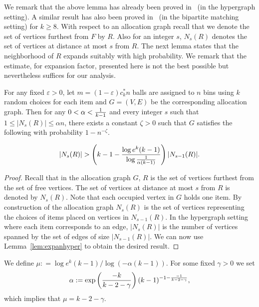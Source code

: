 We remark that the above lemma has already been proved in~\cite{art:fps10} (in the hypergraph setting). A similar result has also been proved in~\cite{fm12} (in the bipartite matching setting) for $k\ge 8$.
With respect to an allocation graph recall that we denote the set of vertices furthest from $F$ by $R$. Also for an integer $s$, $N_s(R)$ denotes the set of vertices at distance at most $s$ from $R$. The next lemma states that the neighborhood of $R$ expands suitably with high probability. We remark that the estimate, for expansion factor, presented here is not the best possible but nevertheless suffices for our analysis. 
\begin{lemma}\label{lem:expan}
For any fixed $\varepsilon>0$, let $m=(1-\varepsilon) c_k^* n$ balls are assigned to $n$ bins using $k$ random choices for each item and $G=(V,E)$ be the corresponding allocation graph. Then for any $0<\alpha < {1\over k-1}$ and every integer $s$ such that $1\le | N_{s}(R)|\le \alpha n$,  there exists a constant $\zeta>0$ such that $G$  satisfies the following with probability $1-n^{-\zeta}$.

\[
	|N_{s}(R) | >  \left( k-1- {\log e^{k}(k-1) \over \log{1\over \alpha(k-1)}}\right)  | N_{s-1}(R)| . \]
	
\end{lemma}
\begin{proof}
Recall that in the allocation graph $G$,  $R$ is the set of vertices furthest from the set of free vertices. The set of vertices at distance at most $s$ from $R$ is denoted by $N_{s}(R)$. Note that each occupied vertex in $G$ holds one item. By construction of the allocation graph $N_{s}(R)$ is the set of vertices representing the choices of items placed on vertices in $N_{s-1}(R)$. In the hypergraph setting where each item corresponds to an edge, $|N_{s}(R)|$ is the number of vertices spanned by the set of edges of size  $|N_{s-1}(R)|$. We can now use Lemma~\ref{lem:expanhyper} to obtain the desired result.
\end{proof}
We define $\mu: =   {\log e^{k}(k-1)/ \log {(- \alpha(k-1))}} .$ For some fixed $\gamma >0$ we set 
\begin{equation} \label{eq:alpha}
\alpha := \exp\left({-k\over k-2-\gamma}\right) (k-1)^{-1- {-1\over k-2-\gamma}},
\end{equation}
which implies that $\mu = k-2-\gamma$.

